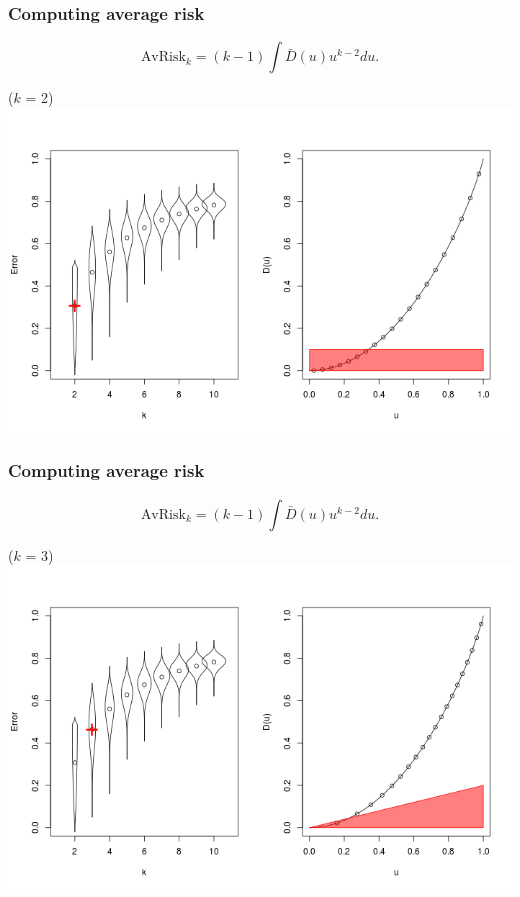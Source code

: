 \documentclass{beamer}
\begin{document}
\begin{frame}
\frametitle{Computing average risk}
\[
\text{AvRisk}_k = (k-1) \int \bar{D}(u) u^{k-2} du.
\]
\begin{center}
($k$ = 2)
\includegraphics[scale = 0.4, clip=true, trim=0 0.1in 0 0.7in]{../extrapolation/rho_0_7_fmla2.png}
\end{center}
\end{frame}

\begin{frame}
\frametitle{Computing average risk}
\[
\text{AvRisk}_k = (k-1) \int \bar{D}(u) u^{k-2} du.
\]
\begin{center}
($k$ = 3)
\includegraphics[scale = 0.4, clip=true, trim=0 0.1in 0 0.7in]{../extrapolation/rho_0_7_fmla3.png}
\end{center}
\end{frame}
\end{document}
